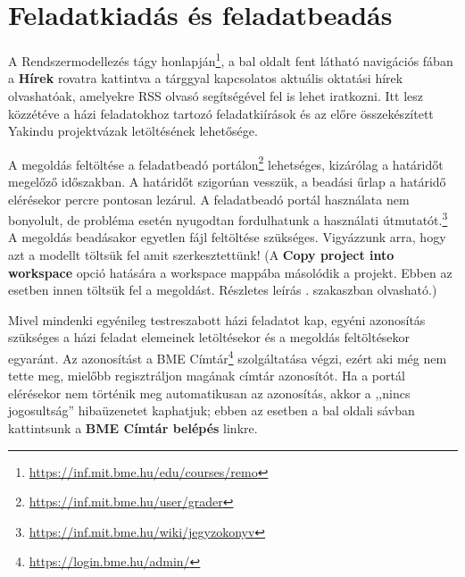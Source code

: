 \section{Feladatkiadás és feladatbeadás}
\label{sec:feladatkiadas-es-feladatbeadas}

A Rendszermodellezés tágy honlapján\footnote{\url{https://inf.mit.bme.hu/edu/courses/remo}}, a bal oldalt fent látható navigációs fában a \textbf{Hírek} rovatra kattintva a tárggyal kapcsolatos aktuális oktatási hírek olvashatóak, amelyekre RSS olvasó segítségével fel is lehet iratkozni. Itt lesz közzétéve a házi feladatokhoz tartozó feladatkiírások és az előre összekészített Yakindu projektvázak letöltésének lehetősége.

A megoldás feltöltése a feladatbeadó portálon\footnote{\url{https://inf.mit.bme.hu/user/grader}} lehetséges, kizárólag a határidőt megelőző időszakban. A határidőt szigorúan vesszük, a beadási űrlap a határidő elérésekor percre pontosan lezárul. A feladatbeadó portál használata nem bonyolult, de probléma esetén nyugodtan fordulhatunk a használati útmutatót.\footnote{\url{https://inf.mit.bme.hu/wiki/jegyzokonyv}} A megoldás beadásakor egyetlen  fájl feltöltése szükséges.
Vigyázzunk arra, hogy azt a modellt töltsük fel amit szerkesztettünk!
(A \textbf{Copy project into workspace} opció hatására a workspace mappába másolódik a projekt.
Ebben az esetben innen töltsük fel a megoldást. Részletes leírás . szakaszban olvasható.)

Mivel mindenki egyénileg testreszabott házi feladatot kap, egyéni azonosítás szükséges a házi feladat elemeinek letöltésekor és a megoldás feltöltésekor egyaránt. Az azonosítást a BME Címtár\footnote{\url{https://login.bme.hu/admin/}} szolgáltatása végzi, ezért aki még nem tette meg, mielőbb regisztráljon magának címtár azonosítót. Ha a portál elérésekor nem történik meg automatikusan az azonosítás, akkor a ,,nincs jogosultság'' hibaüzenetet kaphatjuk; ebben az esetben a bal oldali sávban kattintsunk a \textbf{BME Címtár belépés} linkre.

